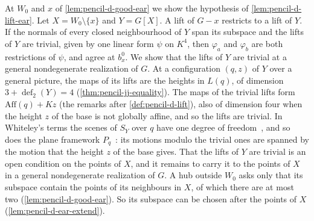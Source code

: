 At $W_0$ and $x$ of \cref{lem:pencil-d-good-ear} we show the hypothesis
of \cref{lem:pencil-d-lift-ear}. Let $X = W_0 \setminus \{x\}$ and
$Y = G[X]$. A lift of $G - x$ restricts to a lift of $Y$. If the normals
of every closed neighbourhood of $Y$ span its subspace and the lifts of
$Y$ are trivial, given by one linear form $\psi$ on $K^4$, then
$\varphi_a$ and $\varphi_b$ are both restrictions of $\psi$, and agree at
$b^0_x$. We show that the lifts of $Y$ are trivial at a general
nondegenerate realization of $G$. At a configuration $(q, z)$ of $Y$
over a general picture, the maps of its lifts are the heights in
$L(q)$, of dimension $3 + \operatorname{def}_2(Y) = 4$
(\cref{thm:pencil-jj-equality}). The maps of the trivial lifts form
$\mathrm{Aff}(q) + Kz$ (the remarks after \cref{def:pencil-d-lift}),
also of dimension four when the height $z$ of the base is not globally
affine, and so the lifts are trivial. In Whiteley's terms the scenes of
$S_Y$ over $q$ have one degree of
freedom~\cite[Definition~2.4]{whiteley1984}, and so does the plane
framework $P_q$~\cite[Corollary~4.2(iv)]{whiteley1984}: its motions
modulo the trivial ones are spanned by the motion that the height $z$
of the base gives. That the lifts of $Y$ are trivial is an open
condition on the points of $X$, and it remains to carry it to the points
of $X$ in a general nondegenerate realization of $G$. A hub outside
$W_0$ asks only that its subspace contain the points of its neighbours
in $X$, of which there are at most two (\cref{lem:pencil-d-good-ear}).
So its subspace can be chosen after the points of $X$
(\cref{lem:pencil-d-ear-extend}).

